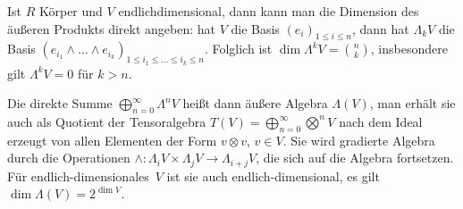 Ist $R$ Körper und $V$ endlichdimensional, dann kann man die Dimension des äußeren Produkts direkt angeben: hat $V$ die Basis $(e_i)_{1 \leq i \leq n}$, dann hat $\Lambda_k V$ die Basis $(e_{i_1} \wedge \dots \wedge e_{i_k})_{1 \leq i_1 \leq \dots \leq i_k \leq n}$. Folglich ist $\dim \Lambda^k V = \binom nk$, insbesondere gilt $\Lambda^k V = 0$ für $k > n$.

Die direkte Summe $\bigoplus_{n=0}^\infty \Lambda^n V$ heißt dann äußere Algebra $\Lambda(V)$, man erhält sie auch als Quotient der Tensoralgebra $T(V) = \bigoplus_{n=0}^\infty \bigotimes^n V$ nach dem Ideal erzeugt von allen Elementen der Form $v \otimes v$, $v \in V$. Sie wird gradierte Algebra durch die Operationen $\wedge: \Lambda_i V \times \Lambda_j V \to \Lambda_{i+j} V$, die sich auf die Algebra fortsetzen. Für endlich-dimensionales~$V$ ist sie auch endlich-dimensional, es gilt $\dim \Lambda(V) = 2^{\dim V}$.
